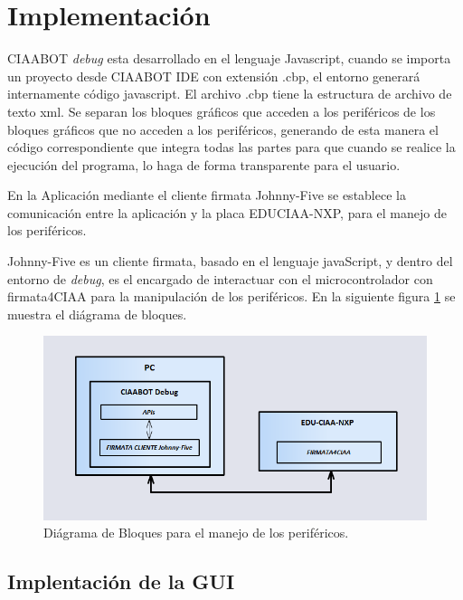 \section{Implementación}
\label{sec:Modelo computacional}

CIAABOT \emph{debug} esta desarrollado en el lenguaje Javascript, cuando se importa un proyecto desde CIAABOT IDE con extensión .cbp, el entorno generará internamente código javascript. El archivo .cbp tiene la estructura de archivo de texto xml. Se separan los bloques gráficos que acceden a los periféricos de los bloques gráficos que no acceden a los periféricos, generando de esta manera el código correspondiente que integra todas las partes para que cuando se realice la ejecución del programa, lo haga de forma transparente para el usuario.

En la Aplicación mediante el cliente firmata Johnny-Five se establece la comunicación entre la aplicación y la placa EDUCIAA-NXP, para el manejo de los periféricos. 

Johnny-Five es un cliente firmata, basado en el lenguaje javaScript, y dentro del entorno de \emph{debug}, es el encargado de interactuar con el microcontrolador con firmata4CIAA para la manipulación de los periféricos.
En la siguiente figura \ref{fig:diagrama-bloques} se muestra el diágrama de bloques.

\begin{figure}[!htbp]
	\centering
	\includegraphics*[width=13cm]{./Figures/diagrama-bloques.PNG}
	\caption{Diágrama de Bloques para el manejo de los periféricos.}
	\par\label{fig:diagrama-bloques}
\end{figure}

\subsection{Implentación de la GUI}
\label{subsec:Implentación de la GUI}


